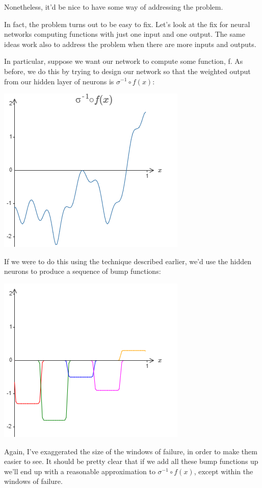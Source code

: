 \documentclass[a4paper,twoside,10pt]{book}
\begin{document}
Nonetheless, it'd be nice to have some way of addressing the problem.

In fact, the problem turns out to be easy to fix. Let's look at the fix for neural networks computing functions with just one input and one output. The same ideas work also to address the problem when there are more inputs and outputs.

In particular, suppose we want our network to compute some function, f. As before, we do this by trying to design our network so that the weighted output from our hidden layer of neurons is $\sigma^{-1}\circ f(x)$:
\begin{center}
	\includegraphics[width=0.6\linewidth]{figures/ch4/tikz454}
\end{center}
If we were to do this using the technique described earlier, we'd use the hidden neurons to produce a sequence of bump functions:
\begin{center}
	\includegraphics[width=0.4\linewidth]{figures/ch4/tikz455}
\end{center}
Again, I've exaggerated the size of the windows of failure, in order to make them easier to see. It should be pretty clear that if we add all these bump functions up we'll end up with a reasonable approximation to $\sigma^{-1}\circ f(x)$, except within the windows of failure.
\end{document}
